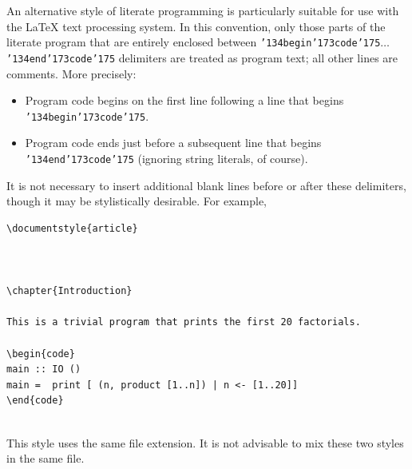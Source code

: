 An alternative style of literate programming is particularly
suitable for use with the LaTeX text processing system.
In this convention, only those parts of the literate program that are
entirely enclosed between \mbox{\tt {\char'134}begin{\char'173}code{\char'175}}$\ldots$\mbox{\tt {\char'134}end{\char'173}code{\char'175}} delimiters are
treated as program text; all other lines are comments.  More precisely:
\begin{itemize}
\item Program code begins on the first line following a line that begins \mbox{\tt {\char'134}begin{\char'173}code{\char'175}}.
\item Program code ends just before a subsequent line that begins \mbox{\tt {\char'134}end{\char'173}code{\char'175}} (ignoring
string literals, of course).
\end{itemize}
It is not necessary
to insert additional blank lines before or after these delimiters, though
it may be stylistically desirable.  For example,
\bprog
{\small\begin{verbatim}
\documentstyle{article}



\chapter{Introduction}

This is a trivial program that prints the first 20 factorials.

\begin{code}
main :: IO ()
main =  print [ (n, product [1..n]) | n <- [1..20]]
\end{code}


\end{verbatim}}
\eprog
This style uses the same file extension.  It is not advisable to mix
these two styles in the same file.

\startnewsection
